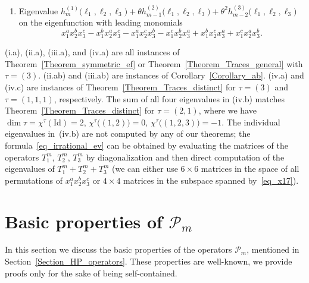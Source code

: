 \documentclass[11pt]{article}
\theoremstyle{definition}
\numberwithin{equation}{section}
\newcommand{\PP}{\mathcal P}
\begin{document}
\begin{enumerate}[label=(\roman*)]
\begin{enumerate}
\begin{multline}
      h_{m-2}\left(  \ell_{1},\ell_{2},\ell_{3}\right)  \sqrt{4\left(  \ell_{1}^{2}+\ell_{2}^{2}+\ell_{3}^{2}\right)  -4\left(  \ell_{1}\ell_{2}+\ell_{1}\ell_{3}+\ell_{2}\ell_{3}\right)  -3\theta^{2}}
   \end{multline}
     on four eigenfunctions with leading monomials in the space spanned by
    \begin{equation}
    \label{eq_x17}
    x_1^a x_2^b x_3^c-x_1^b x_2^c x_3^a,\quad x_1^a x_2^b x_3^c-x_1^c x_2^a x_3^b,\quad x_1^b x_2^a x_3^c-x_1^a x_2^c x_3^b,\quad x_1^b x_2^a x_3^c-x_1^c x_2^b x_3^a.
    \end{equation}
    \item Eigenvalue $h^{(1)}_m\bigl(\ell_1,\ell_2,\ell_3\bigr)+\theta h^{(2)}_{m-1}\bigl(\ell_1,\ell_2,\ell_3\bigr)+\theta^2  h^{(3)}_{m-2}\bigl(\ell_1,\ell_2,\ell_3\bigr)$ on the eigenfunction with leading monomials
     $$x_1^a x_2^b x_3^c -x_1^b x_2^a x_3^c-x_1^a x_2^c x_3^b-x_1^c x_2^b x_3^a+x_1^b x_2^c x_3^a+x_1^c x_2^a x_3^b.$$
   \end{enumerate}
\end{enumerate}

(i.a), (ii.a), (iii.a), and (iv.a) are all instances of Theorem~\ref{Theorem_symmetric_ef} or Theorem~\ref{Theorem_Traces_general} with $\tau=(3)$. (ii.ab) and (iii.ab) are instances of Corollary~\ref{Corollary_ab}. (iv.a) and (iv.c) are instances of Theorem~\ref{Theorem_Traces_distinct} for $\tau=(3)$ and $\tau=(1,1,1)$, respectively. The sum of all four eigenvalues in (iv.b) matches Theorem~\ref{Theorem_Traces_distinct} for $\tau=(2,1)$, where we have $\dim\tau=\chi^{\tau}(\mathrm{Id})=2$, $\chi^{\tau}\bigl( (1,2)\bigr)=0$, $\chi^{\tau}\bigl( (1,2,3)\bigr)=-1$. The individual eigenvalues in~(iv.b) are not computed by any of our theorems; the formula~\eqref{eq_irrational_ev} can be obtained by evaluating the matrices of the operators $T_1^m$, $T_2^m$, $T_3^m$ by diagonalization and then direct computation of the eigenvalues of $T_1^m+T_2^m+T_3^m$ (we can either use $6\times 6$ matrices in the space of all permutations of $x_1^a x_2^b x_3^c$ or $4\times 4$ matrices in the subspace spanned by~\eqref{eq_x17}).

\appendix

\section{Basic properties of \texorpdfstring{$\PP_m$}{Pm}}
\label{Section_appendix}

In this section we discuss the basic properties of the operators $\PP_m$, mentioned in Section~\ref{Section_HP_operators}. These properties are well-known, we provide proofs only for the sake of being self-contained.
\end{document}

